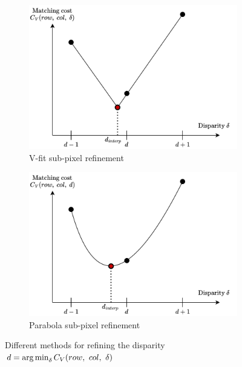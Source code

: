 \begin{figure}
    \centering
    \begin{subfigure}[t]{0.5\linewidth}
        \centering
        \includegraphics[width=\linewidth]{Images/Chap_1/subpixel_refinment_vfit.png}
        \caption{V-fit sub-pixel refinement}
        \label{fig:vfit_refinement}
    \end{subfigure}\hfill
    \begin{subfigure}[t]{0.5\linewidth}
        \centering
        \includegraphics[width=\linewidth]{Images/Chap_1/subpixel_refinment_parabola.png}
        \caption{Parabola sub-pixel refinement}
        \label{fig:parabola_refinement}
    \end{subfigure}
    \caption{Different methods for refining the disparity $d=\operatorname*{arg\,min}_\delta C_V(row, ~col, ~\delta)$}
    \label{fig:sub-pixel_refinement}
\end{figure}

